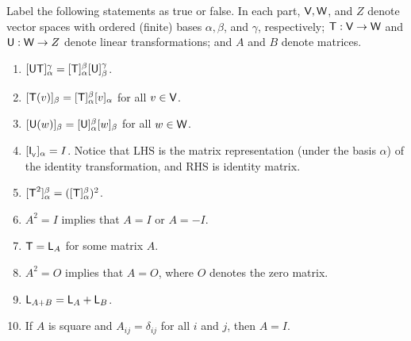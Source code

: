 \exercisesection

\begin{exercise} \label{exercise 2.3.1}
Label the following statements as true or false.
In each part, \(\textsf{V}, \textsf{W}\), and \(Z\) denote vector spaces with ordered (finite) bases \(\alpha, \beta\), and \(\gamma\), respectively;
\(\textsf{T} : \textsf{V} \to \textsf{W}\) and \(\textsf{U} : \textsf{W} \to Z\) denote linear transformations;
and \(A\) and \(B\) denote matrices.

\begin{enumerate}
\item \([\textsf{U}\textsf{T}]_{\alpha}^{\gamma} = [\textsf{T}]_{\alpha}^{\beta}[\textsf{U}]_{\beta}^{\gamma}\).
\item \([\textsf{T}(v)]_{\beta} = [\textsf{T}]_{\alpha}^{\beta}[v]_{\alpha}\) for all \(v \in \textsf{V}\).
\item \([\textsf{U}(w)]_{\beta} = [\textsf{U}]_{\alpha}^{\beta}[w]_{\beta}\) for all \(w \in \textsf{W}\).
\item \([\textsf{I}_{_{\textsf{V}}}]_{\alpha} = I\).
    Notice that LHS is the matrix representation (under the basis \(\alpha\)) of the identity transformation,
    and RHS is identity matrix.
\item \([\textsf{T}^2]_{\alpha}^{\beta} = ([\textsf{T}]_{\alpha}^{\beta})^2\).
\item \(A^2 = I\) implies that \(A = I\) or \(A = -I\).
\item \(\textsf{T} = \textsf{L}_A\) for some matrix \(A\).
\item \(A^2 = O\) implies that \(A = O\), where \(O\) denotes the zero matrix.
\item \(\textsf{L}_{A + B} = \textsf{L}_A + \textsf{L}_B\).
\item If \(A\) is square and \(A_{ij} = \delta_{ij}\) for all \(i\) and \(j\), then \(A = I\).
\end{enumerate}
\end{exercise}

